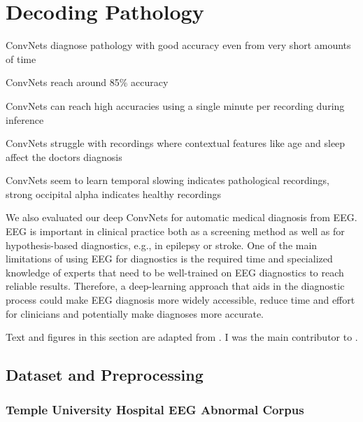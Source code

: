 \chapter{Decoding Pathology}\label{pathology}

\begin{startbox}{ConvNets diagnose pathology with good accuracy even from very short amounts of time} 
\item ConvNets reach around 85\% accuracy
\item ConvNets can reach high accuracies using a single minute per recording during inference
\item ConvNets struggle with recordings where contextual features like age and sleep affect the doctors diagnosis
\item ConvNets seem to learn temporal slowing indicates pathological recordings, strong occipital alpha indicates healthy recordings
\end{startbox}


    We also evaluated our deep ConvNets for automatic medical diagnosis from
EEG. EEG is important in clinical practice both as a screening method as
well as for hypothesis-based diagnostics, e.g., in epilepsy or stroke.
One of the main limitations of using EEG for diagnostics is the required
time and specialized knowledge of experts that need to be well-trained
on EEG diagnostics to reach reliable results. Therefore, a deep-learning
approach that aids in the diagnostic process could make EEG diagnosis
more widely accessible, reduce time and effort for clinicians and
potentially make diagnoses more accurate. 

Text and figures in this
section are adapted from \citet{schirrmeisterdeeppathology}.
I was the main contributor to
\citet{schirrmeisterdeeppathology}.

\section{Dataset and Preprocessing}\label{dataset-and-preprocessing}

\subsection{Temple University Hospital EEG Abnormal
Corpus}\label{temple-university-hospital-eeg-abnormal-corpus}

